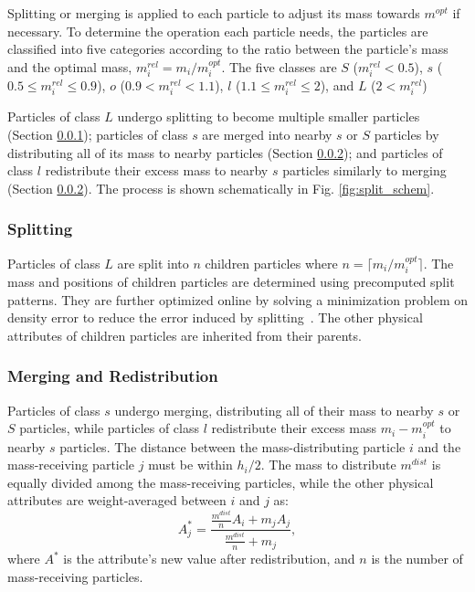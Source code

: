 \documentclass[VANCOUVER,STIX1COL]{WileyNJD-v2}
\begin{document}
Splitting or merging is applied to each particle to adjust its mass towards $m^{opt}$ if necessary. To determine the operation each particle needs, the particles are classified into five categories according to the ratio between the particle's mass and the optimal mass, $m_i^{rel} = m_i / m_i^{opt}$. The five classes are $S$ ($m_i^{rel} < 0.5$), $s$ ($0.5 \leq m_i^{rel} \leq 0.9$), $o$ ($0.9 < m_i^{rel} < 1.1$), $l$ ($1.1 \leq m_i^{rel} \leq 2$), and $L$ ($2 < m_i^{rel}$)

Particles of class $L$ undergo splitting to become multiple smaller particles (Section \ref{sec:split}); particles of class $s$  are merged into nearby $s$ or $S$ particles by distributing all of its mass to nearby particles (Section \ref{sec:merge}); and particles of class $l$ redistribute their excess mass to nearby $s$ particles similarly to merging (Section \ref{sec:merge}). The process is shown schematically in Fig. \ref{fig:split_schem}.

\subsubsection{Splitting}
\label{sec:split}
Particles of class $L$ are split into $n$ children particles where $n = \lceil m_i / m_i^{opt} \rceil$. The mass and positions of children particles are determined using precomputed split patterns. They are further optimized online by solving a minimization problem on density error to reduce the error induced by splitting~\cite{Winchenbach21}. The other physical attributes of children particles are inherited from their parents.

\subsubsection{Merging and Redistribution}
\label{sec:merge}
Particles of class $s$ undergo merging, distributing all of their mass to nearby $s$ or $S$ particles, while particles of class $l$ redistribute their excess mass $m_i - m_i^{opt}$ to nearby $s$ particles. The distance between the mass-distributing particle $i$ and the mass-receiving particle $j$ must be within $h_i / 2$. The mass to distribute $m^{dist}$ is equally divided among the mass-receiving particles, while the other physical attributes are weight-averaged between $i$ and $j$ as:
\begin{equation}
    A_j^* = \frac{\frac{m^{dist}}{n}A_i + m_j A_j}{\frac{m^{dist}}{n} + m_j},
\end{equation}
where $A^*$ is the attribute's new value after redistribution, and $n$ is the number of mass-receiving particles.
\end{document}

